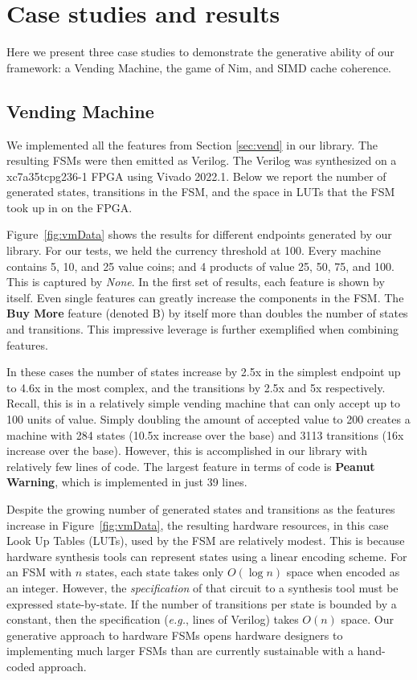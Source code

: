 \documentclass[conference]{IEEEtran}
\begin{document}
\section{Case studies and results}\label{sec:results}
Here we present three case studies to demonstrate the generative ability of our framework: a Vending Machine, the game of Nim, and SIMD cache coherence.

\subsection{Vending Machine}\label{sec:vendresults}
We implemented all the features from Section \ref{sec:vend} in our library. The resulting FSMs were then emitted as Verilog. The Verilog was synthesized on a xc7a35tcpg236-1 FPGA using Vivado 2022.1. Below we report the number of generated states, transitions in the FSM, and the space in LUTs that the FSM took up in on the FPGA.

Figure~\ref{fig:vmData} shows the results for different endpoints generated by our library. For our tests, we held the currency threshold at 100. Every machine contains 5, 10, and 25 value coins; and 4 products of value 25, 50, 75, and 100. This is captured by \emph{None}. In the first set of results, each feature is shown by itself. Even single features can greatly increase the components in the FSM. The \textbf{Buy More} feature (denoted B) by itself more than doubles the number of states and transitions. This impressive leverage is further exemplified when combining features. 

In these cases the number of states increase by 2.5x in the simplest endpoint up to 4.6x in the most complex, and the transitions by 2.5x and 5x respectively. Recall, this is in a relatively simple vending machine that can only accept up to 100 units of value. Simply doubling the amount of accepted value to 200 creates a machine with 284 states (10.5x increase over the base) and 3113 transitions (16x increase over the base). However, this is accomplished in our library with relatively few lines of code. The largest feature in terms of code is \textbf{Peanut Warning}, which is implemented in just 39 lines.

Despite the growing number of generated states and transitions as the features increase in Figure~\ref{fig:vmData}, the resulting hardware resources, in this case Look Up Tables (LUTs), used by the FSM are relatively modest. This is because hardware synthesis tools can represent states using a linear encoding scheme.  For an FSM with $n$ states, each state takes only $O(\log{n})$ space when encoded as an integer.  However, the \emph{specification} of that circuit to a synthesis tool must be expressed state-by-state.  If the number of transitions per state is bounded by a constant, then the specification (\textit{e.g.}, lines of Verilog) takes $O(n)$ space.  Our generative approach to hardware FSMs opens hardware designers to implementing much larger FSMs than are currently sustainable with a hand-coded approach.
\end{document}
